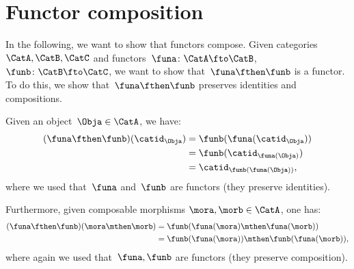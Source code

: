 

\section{Functor composition}


In the following, we want to show that functors compose.
Given categories~$\CatA,\CatB,\CatC$ and functors~$\funa\colon \CatA\fto \CatB$,~$\funb \colon \CatB\fto \CatC$, we want to show that~$\funa\fthen\funb$ is a functor. To do this, we show that~$\funa\fthen\funb$ preserves identities and compositions.
\begin{compactitem}
  \item Given an object~$\Obja\in \CatA$, we have:
  \begin{equation*}
    \begin{aligned}
    (\funa\fthen\funb)(\catid_\Obja)
      &=\funb(\funa(\catid_\Obja))\\
      &=\funb(\catid_{\funa(\Obja)})\\
      &=\catid_{\funb(\funa(\Obja))},
    \end{aligned}
  \end{equation*}
  where we used that~$\funa$ and~$\funb$ are functors (they preserve identities).
  \item Furthermore, given composable morphisms $\mora,\morb\in \CatA$, one has:
  \begin{equation*}
    \begin{aligned}
    (\funa\fthen\funb)(\mora\mthen\morb)
      &=\funb(\funa(\mora)\mthen \funa(\morb))\\
      &=\funb(\funa(\mora))\mthen \funb(\funa(\morb)),
    \end{aligned}
  \end{equation*}
  where again we used that~$\funa,\funb$ are functors (they preserve composition).
\end{compactitem}


